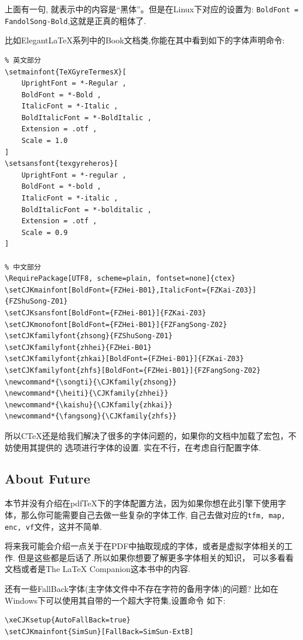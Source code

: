 上面有一句, 就表示中的内容是``黑体''。但是在Linux下对应的设置为:
\texttt{BoldFont = FandolSong-Bold},这就是正真的粗体了.

比如Elegant\LaTeX{}系列中的Book文档类,你能在其中看到如下的字体声明命令:
\begin{verbatim}
% 英文部分
\setmainfont{TeXGyreTermesX}[
    UprightFont = *-Regular ,
    BoldFont = *-Bold ,
    ItalicFont = *-Italic ,
    BoldItalicFont = *-BoldItalic ,
    Extension = .otf ,
    Scale = 1.0
]
\setsansfont{texgyreheros}[
    UprightFont = *-regular ,
    BoldFont = *-bold ,
    ItalicFont = *-italic ,
    BoldItalicFont = *-bolditalic ,
    Extension = .otf ,
    Scale = 0.9
]

% 中文部分
\RequirePackage[UTF8, scheme=plain, fontset=none]{ctex}
\setCJKmainfont[BoldFont={FZHei-B01},ItalicFont={FZKai-Z03}]{FZShuSong-Z01}
\setCJKsansfont[BoldFont={FZHei-B01}]{FZKai-Z03}
\setCJKmonofont[BoldFont={FZHei-B01}]{FZFangSong-Z02}
\setCJKfamilyfont{zhsong}{FZShuSong-Z01}
\setCJKfamilyfont{zhhei}{FZHei-B01}
\setCJKfamilyfont{zhkai}[BoldFont={FZHei-B01}]{FZKai-Z03}
\setCJKfamilyfont{zhfs}[BoldFont={FZHei-B01}]{FZFangSong-Z02}
\newcommand*{\songti}{\CJKfamily{zhsong}}
\newcommand*{\heiti}{\CJKfamily{zhhei}}
\newcommand*{\kaishu}{\CJKfamily{zhkai}}
\newcommand*{\fangsong}{\CJKfamily{zhfs}}
\end{verbatim}

所以C\TeX{}还是给我们解决了很多的字体问题的，如果你的文档中加载了宏包，不妨使用其提供的
选项进行字体的设置. 实在不行，在考虑自行配置字体.

\subsection{About Future}
本节并没有介绍在pdf\TeX{}下的字体配置方法，因为如果你想在此引擎下使用字体，那么你可能需要自己去做一些复杂的字体工作,
自己去做对应的\texttt{tfm, map, enc, vf}文件，这并不简单. 

将来我可能会介绍一点关于在PDF中抽取现成的字体，或者是虚拟字体相关的工作. 但是这些都是后话了.所以如果你想要了解更多字体相关的知识，
可以多看看文档或者是{The \LaTeX{} Companion}这本书中的内容.

还有一些FallBack字体(主字体文件中不存在字符的备用字体)的问题? 比如在Windows下可以使用其自带的一个超大字符集,设置命令
如下:
\begin{verbatim}
\xeCJKsetup{AutoFallBack=true}
\setCJKmainfont{SimSun}[FallBack=SimSun-ExtB]
\end{verbatim}

